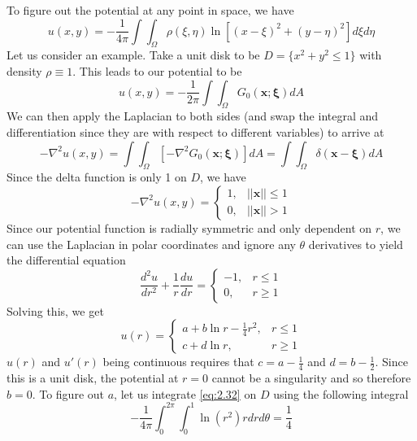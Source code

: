 \documentclass{article}
\newcommand{\od}[2]{\frac{d #1}{d #2}}
\newcommand{\odt}[2]{\frac{d^2 #1}{d #2 ^2}}
\newcommand{\vb}[1]{\mathbf{ #1}}
\newcommand{\lap}{\nabla ^2}
\newcommand{\pull}{\! \! \!}
\newcommand{\dint}{\int \pull \int}
\newcommand{\fsgf}{G_0(\vb{x};\boldsymbol{\xi})}
\numberwithin{equation}{section}
\begin{document}
To figure out the potential at any point in space, we have 
\begin{equation}
    u(x,y) =-\frac{1}{4\pi} \dint_\Omega \rho(\xi,\eta)\ln [(x-\xi)^2+(y-\eta)^2] d\xi d\eta
\end{equation}
Let us consider an example. Take a unit disk to be $D = \{x^2+y^2 \leq 1 \}$ with density $\rho \equiv 1$. This leads to our potential to be 
\begin{equation}
    u(x,y) = -\frac{1}{2\pi}\dint_\Omega \fsgf dA \label{eq:2.32}
\end{equation}
We can then apply the Laplacian to both sides (and swap the integral and differentiation since they are with respect to different variables) to arrive at 
\begin{equation*}
    -\lap u(x,y) = \dint_\Omega [-\lap \fsgf] dA = \dint_\Omega \delta(\vb{x} - \boldsymbol{\xi}) dA 
\end{equation*}
Since the delta function is only 1 on $D$, we have 
\begin{equation*}
    -\lap u (x,y) = 
    \begin{cases}
    1, & ||\vb{x}|| \leq 1 \\
    0, & ||\vb{x}|| > 1
    \end{cases}
\end{equation*}
Since our potential function is radially symmetric and only dependent on $r$, we can use the Laplacian in polar coordinates and ignore any $\theta$ derivatives to yield the differential equation 
\begin{equation*}
    \odt{u}{r} + \frac{1}{r} \od{u}{r} =
    \begin{cases}
        -1, & r \leq 1 \\
        0, & r \geq 1
    \end{cases}
\end{equation*}
Solving this, we get 
\begin{equation}
    u(r) = 
    \begin{cases}
        a+b\ln r -\frac{1}{4}r^2, & r \leq 1 \\
        c+d\ln r, &r \geq 1 \label{eq:2.33}
    \end{cases}
\end{equation}
$u(r)$ and $u'(r)$ being continuous requires that $c=a-\frac{1}{4}$ and $d=b-\frac{1}{2}$. Since this is a unit disk, the potential at $r=0 $  cannot be a singularity and so therefore $b=0$. To figure out $a$, let us integrate \eqref{eq:2.32} on $D$ using the following integral 
\begin{equation*}
    -\frac{1}{4\pi}\int^{2\pi}_0 \pull \int_0^1 \ln (r^2) rdrd\theta = \frac{1}{4}
\end{equation*}
\end{document}
